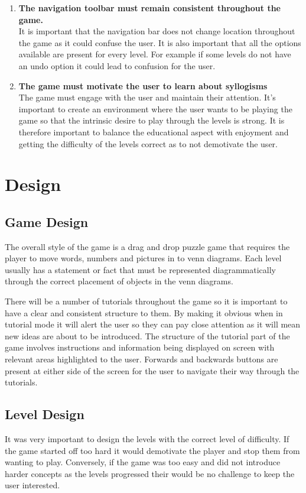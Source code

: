 \documentclass[12pt,a4paper]{report}
\begin{document}
\begin{enumerate}[label*=\arabic*]
                                      \item \textbf{The navigation toolbar must remain consistent throughout the game.
                                      }\\
It is important that the navigation bar does not change location throughout the game as it could confuse the user. It is also important that all the options available are present for every level. For example if some levels do not have an undo option it could lead to confusion for the user.

                                      \item \textbf{The game must motivate the user to learn about syllogisms
}\\
The game must engage with the user and maintain their attention. It's important to create an environment where the user wants to be playing the game so that the intrinsic desire to play through the levels is strong. It is therefore important to balance the educational aspect with enjoyment and getting the difficulty of the levels correct as to not demotivate the user.
            \end{enumerate}
            
\chapter{Design}


\section{Game Design}
The overall style of the game is a drag and drop puzzle game that requires the player to move words, numbers and pictures in to venn diagrams. Each level usually has a statement or fact that must be represented diagrammatically through the correct placement of objects in the venn diagrams.

There will be a number of tutorials throughout the game so it is important to have a clear and consistent structure to them. By making it obvious when in tutorial mode it will alert the user so they can pay close attention as it will mean new ideas are about to be introduced. The structure of the tutorial part of the game involves instructions and information being displayed on screen with relevant areas highlighted to the user. Forwards and backwards buttons are present at either side of the screen for the user to navigate their way through the tutorials. 

\section{Level Design}
It was very important to design the levels with the correct level of difficulty. If the game started off too hard it would demotivate the player and stop them from wanting to play. Conversely, if the game was too easy and did not introduce harder concepts as the levels progressed their would be no challenge to keep the user interested.
\end{document}
